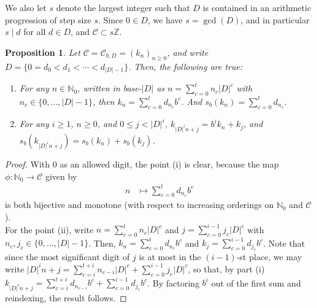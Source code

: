 \documentclass[12pt]{amsart}
\numberwithin{equation}{section}
\newtheorem{proposition}[equation]{Proposition}
\theoremstyle{definition}
\begin{document}
We also let $s$ denote the largest integer such that $D$ is contained in an arithmetic progression of step size $s$. 
Since $0\in D$, we have $s=\gcd(D)$, and in particular $s\mid d$ for all $d\in D$, and $\mathcal C\subset s\mathbb{Z}$.
 



\begin{proposition} \label{p;CantorStructure}
    Let $\mathcal C=\mathcal C_{b,D}=(k_n)_{n\geq 0}$, and write $D=\{0=d_0<d_1<\cdots<d_{|D|-1}\}$.  Then, the following are true: 
    \begin{enumerate}
        \item[(i)] For any $n\in \mathbb{N}_0$, written in base-$|D|$ as $n=\sum_{c=0}^tn_c|D|^c$ with $n_c\in \{0,...,|D|-1\}$, then $k_n=\sum_{c=0}^td_{n_c}b^c$.  And $s_b(k_n)=\sum_{c=0}^td_{n_c}$.  
        \item[(ii)] For any $i\geq 1 $, $n \geq 0$, and $0\leq j < |D|^i$, $k_{|D|^in+j}=b^ik_n+k_j$, 
        and $s_b(k_{|D|^in+j})=s_b(k_n)+s_b(k_j)$. 
    \end{enumerate}
\end{proposition}

\begin{proof}
    With $0$ as an allowed digit, the point (i) is clear, because the map $\phi:\mathbb{N}_0\rightarrow \mathcal C$ given by  \begin{align*} n&\mapsto \sum_{c=0}^td_{n_c}b^c\end{align*} 
    is both bijective and monotone (with respect to increasing orderings on $\mathbb{N}_0$ and $\mathcal C$). \\
    
    For the point (ii), write $n=\sum_{c=0}^tn_c|D|^c$ and $j=\sum_{c=0}^{i-1}j_c|D|^c$ with $n_c,j_c\in \{0,...,|D|-1\}$. Then, $k_n=\sum_{c=0}^td_{n_c}b^c$ and $k_j=\sum_{c=0}^{i-1}d_{j_c}b^c$. Note that since the most significant digit of $j$ is at most in the $(i-1)$-st place, we may write $|D|^in+j=\sum_{c=i}^{t+i}n_{c-i}|D|^c+\sum_{c=0}^{i-1}j_c|D|^c$, so that, by part (i) $k_{|D|^in+j}=\sum_{c=i}^{t+i}d_{n_{c-i}}b^c+\sum_{c=0}^{i-1}d_{j_c}b^c$. By factoring $b^i$ out of the first sum and reindexing, the result follows.


\end{proof} 
\end{document}
